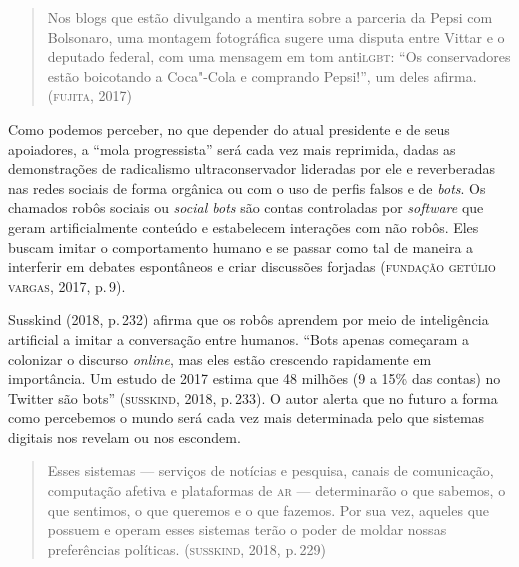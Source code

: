 \begin{quote}
Nos blogs que estão divulgando a mentira sobre a parceria da Pepsi com
Bolsonaro, uma montagem fotográfica sugere uma disputa entre Vittar e o
deputado federal, com uma mensagem em tom anti\textsc{lgbt}: ``Os conservadores
estão boicotando a Coca"-Cola e comprando Pepsi!'', um deles afirma.
(\textsc{fujita}, 2017)
\end{quote}



Como podemos perceber, no que depender do atual presidente e de seus
apoiadores, a ``mola progressista'' será cada vez mais reprimida, dadas
as demonstrações de radicalismo ultraconservador lideradas por ele e
reverberadas nas redes sociais de forma orgânica ou com o uso de perfis
falsos e de \textit{bots}. Os chamados robôs sociais ou \textit{social bots} são
contas controladas por \textit{software} que geram artificialmente conteúdo e
estabelecem interações com não robôs. Eles buscam imitar o comportamento
humano e se passar como tal de maneira a interferir em debates
espontâneos e criar discussões forjadas (\textsc{fundação getúlio vargas}, 2017,
p.\,9).

Susskind (2018, p.\,232) afirma que os robôs aprendem por meio de
inteligência artificial a imitar a conversação entre humanos. ``Bots
apenas começaram a colonizar o discurso \textit{online}, mas eles estão
crescendo rapidamente em importância. Um estudo de 2017 estima que 48
milhões (9 a 15\% das contas) no Twitter são bots'' (\textsc{susskind},
2018, p.\,233). O autor alerta que no futuro a forma como percebemos o
mundo será cada vez mais determinada pelo que sistemas digitais nos
revelam ou nos escondem.

\begin{quote}
Esses sistemas --- serviços de notícias e pesquisa, canais de
comunicação, computação afetiva e plataformas de \textsc{ar} --- determinarão o
que sabemos, o que sentimos, o que queremos e o que fazemos. Por sua
vez, aqueles que possuem e operam esses sistemas terão o poder de moldar
nossas preferências políticas. (\textsc{susskind}, 2018, p.\,229)
\end{quote}


